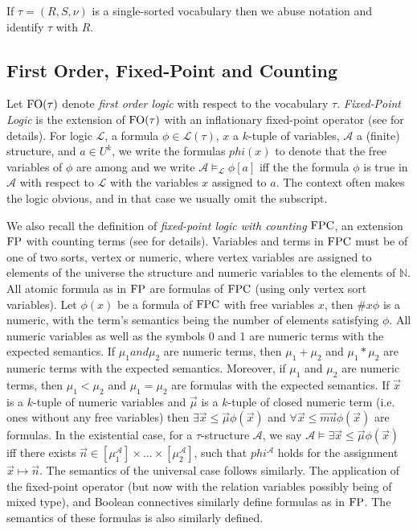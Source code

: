 \documentclass[../paper.tex]{subfiles}
\begin{document}
If $\tau = (R, S, \nu)$ is a single-sorted vocabulary then we abuse notation and
identify $\tau$ with $R$.

\subsection{First Order, Fixed-Point and Counting}
Let $\text{\upshape FO}(\tau)$ denote \emph{first order logic} with respect to the vocabulary
$\tau$. \emph{Fixed-Point Logic} is the extension of $\text{\upshape FO}(\tau)$ with an
inflationary fixed-point operator (see \cite{} for details). For logic
$\mathcal{L}$, a formula $\phi \in \mathcal{L}(\tau)$, $x$ a $k$-tuple of
variables, $\mathcal{A}$ a (finite) structure, and $a \in U^k$, we write the
formulas $phi (x)$ to denote that the free variables of $\phi$ are among and we
write $\mathcal{A} \models_{\mathcal{L}} \phi[a]$ iff the the formula $\phi$ is
true in $\mathcal{A}$ with respect to $\mathcal{L}$ with the variables $x$
assigned to $a$. The context often makes the logic obvious, and in that case we
usually omit the subscript.

We also recall the definition of \emph{fixed-point logic with counting} $\text{\upshape FPC}$,
an extension $\text{\upshape FP}$ with counting terms (see \cite{grohe2017descriptive} for
details). Variables and terms in $\text{\upshape FPC}$ must be of one of two sorts, vertex or
numeric, where vertex variables are assigned to elements of the universe the
structure and numeric variables to the elements of $\mathbb{N}$. All atomic
formula as in $\text{\upshape FP}$ are formulas of $\text{\upshape FPC}$ (using only vertex sort variables).
Let $\phi(x)$ be a formula of $\text{\upshape FPC}$ with free variables $x$, then $\# x \phi$
is a numeric, with the term's semantics being the number of elements satisfying
$\phi$. All numeric variables as well as the symbols 0 and 1 are numeric terms
with the expected semantics. If $\mu_1 and \mu_2$ are numeric terms, then $\mu_1
+ \mu_2$ and $\mu_1 * \mu_2$ are numeric terms with the expected semantics.
Moreover, if $\mu_1$ and $\mu_2$ are numeric terms, then $\mu_1 < \mu_2$ and
$\mu_1 = \mu_2$ are formulas with the expected semantics. If $\vec{x}$ is a
$k$-tuple of numeric variables and $\vec{\mu}$ is a $k$-tuple of closed numeric
term (i.e. ones without any free variables) then $\exists \vec{x} \leq \vec{\mu}
\phi(\vec{x})$ and $\forall \vec{x} \leq \vec{mu} \phi(\vec{x})$ are formulas.
In the existential case, for a $\tau$-structure $\mathcal{A}$, we say
$\mathcal{A} \models \exists \vec{x} \leq \vec{\mu} \phi(\vec{x})$ iff there
exists $\vec{n} \in [\mu^{\mathcal{A}}_1] \times \ldots \times
[\mu^{\mathcal{A}}_2]$, such that $phi^{\mathcal{A}}$ holds for the assignment
$\vec{x} \mapsto \vec{n}$. The semantics of the universal case follows
similarly. The application of the fixed-point operator (but now with the
relation variables possibly being of mixed type), and Boolean connectives
similarly define formulas as in $\text{\upshape FP}$. The semantics of these formulas is also
similarly defined.
\end{document}
